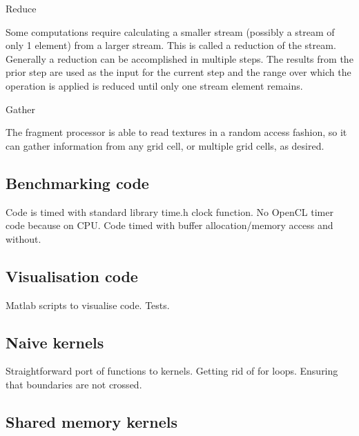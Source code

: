 Reduce

Some computations require calculating a smaller stream (possibly a stream of only 1 element) from a larger stream. This is called a reduction of the stream. Generally a reduction can be accomplished in multiple steps. The results from the prior step are used as the input for the current step and the range over which the operation is applied is reduced until only one stream element remains.

Gather

The fragment processor is able to read textures in a random access fashion, so it can gather information from any grid cell, or multiple grid cells, as desired.


\subsection{Benchmarking code}
Code is timed with standard library time.h clock function.
No OpenCL timer code because on CPU. Code timed with buffer allocation/memory access and without.

\subsection{Visualisation code}
Matlab scripts to visualise code. Tests.

\subsection{Naive kernels}
Straightforward port of functions to kernels. Getting rid of for loops. Ensuring that boundaries are not crossed.


\subsection{Shared memory kernels}